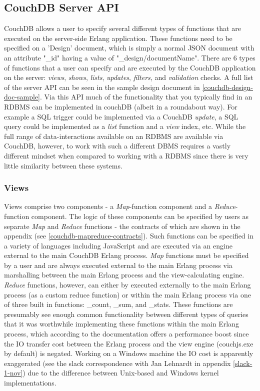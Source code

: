 \subsection{CouchDB Server API}
CouchDB allows a user to specify several different types of functions that are executed on the server-side Erlang application. These functions need to be specified on a 'Design' document, which is simply a normal JSON document with an attribute "\_id" having a value of "\_design/documentName". There are 6 types of functions that a user can specify and are executed by the CouchDB application on the server: \textit{views}, \textit{shows}, \textit{lists}, \textit{updates}, \textit{filters}, and \textit{validation} checks. A full list of the server API can be seen in the sample design document in \ref{couchdb-design-doc-sample}. Via this API much of the functionality that you typically find in an RDBMS can be implemented in couchDB (albeit in a roundabout way). For example a SQL trigger could be implemented via a CouchDB \textit{update}, a SQL query could be implemented as a \textit{list} function and a \textit{view} index, etc. While the full range of data-interactions available on an RDBMS are available via CouchDB, however, to work with such a different DBMS requires a vastly different mindset when compared to working with a RDBMS since there is very little similarity between these systems.

\subsubsection{Views}
Views comprise two components - a \textit{Map}-function component and a \textit{Reduce}-function component. The logic of these components can be specified by users as separate \textit{Map} and \textit{Reduce} functions - the contracts of which are shown in the appendix (see \ref{couchdb-mapreduce-contracts}). Such functions can be specified in a variety of languages including JavaScript and are executed via an engine external to the main CouchDB Erlang process. \textit{Map} functions must be specified by a user and are always executed external to the main Erlang process via marshalling between the main Erlang process and the view-calculating engine. \textit{Reduce} functions, however, can either by executed externally to the main Erlang process (as a custom reduce function) or within the main Erlang process via one of three built in functions: \_count, \_sum, and \_stats. These functions are presumably see enough common functionality between different types of queries that it was worthwhile implementing these functions within the main Erlang process, which according to the documentation offers a performance boost since the IO transfer cost between the Erlang process and the view engine (couchjs.exe by default) is negated. Working on a Windows machine the IO cost is apparently exaggerated (see the slack correspondence with Jan Lehnardt in appendix \ref{slack-1-nov}) due to the difference between Unix-based and Windows kernel implementations.


